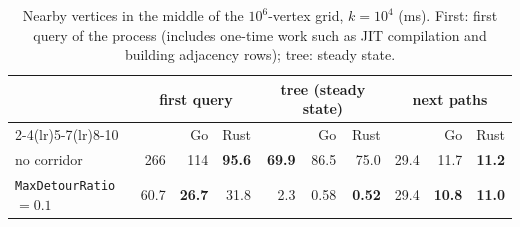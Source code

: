 \begin{table}[t]
\centering
\caption{Nearby vertices in the middle of the $10^6$-vertex grid, $k=10^4$ (ms). First: first query of the process (includes one-time work such as JIT compilation and building adjacency rows); tree: steady state.}
\label{tab:local}
\small
\begin{tabular}{lrrrrrrrrr}
\toprule
 & \multicolumn{3}{c}{first query} & \multicolumn{3}{c}{tree (steady state)} & \multicolumn{3}{c}{next paths} \\ \cmidrule(lr){2-4}\cmidrule(lr){5-7}\cmidrule(lr){8-10}
 & \cs{} & Go & Rust & \cs{} & Go & Rust & \cs{} & Go & Rust \\
\midrule
no corridor & \num{266} & \num{114} & \textbf{95.6} & \textbf{69.9} & 86.5 & 75.0 & 29.4 & 11.7 & \textbf{11.2} \\
\texttt{MaxDetourRatio} $=0.1$ & 60.7 & \textbf{26.7} & 31.8 & 2.3 & 0.58 & \textbf{0.52} & 29.4 & \textbf{10.8} & \textbf{11.0} \\
\bottomrule
\end{tabular}
\end{table}

